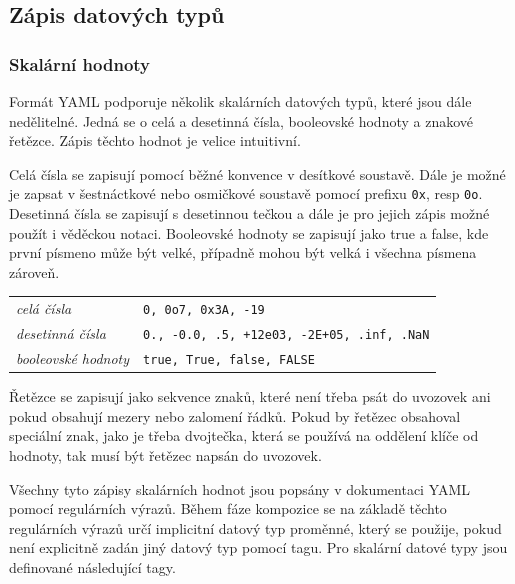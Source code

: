 \documentclass[FM,bw,DP]{tulthesis}
\begin{document}

\subsection{Zápis datových typů}
\label{sec:analyza-yaml-zapis-datovych-typu}

\subsubsection*{Skalární hodnoty}

Formát YAML podporuje několik skalárních datových typů, které jsou dále nedělitelné. Jedná se o celá a desetinná čísla, booleovské hodnoty a znakové řetězce. Zápis těchto hodnot je velice intuitivní. 

Celá čísla se zapisují pomocí běžné konvence v desítkové soustavě. Dále je možné je zapsat v šestnáctkové nebo osmičkové soustavě pomocí prefixu \texttt{0x}, resp \texttt{0o}. Desetinná čísla se zapisují s desetinnou tečkou a dále je pro jejich zápis možné použít i věděckou notaci. Booleovské hodnoty se zapisují jako true a false, kde první písmeno může být velké, případně mohou být velká i všechna písmena zároveň.

\vspace{0.5cm}
\begin{tabular}{m{5cm}@{}l}
\textit{celá čísla}\dotfill & \texttt{0, 0o7, 0x3A, -19} \\
\textit{desetinná čísla}\dotfill & \texttt{0., -0.0, .5, +12e03, -2E+05, .inf, .NaN}  \\
\textit{booleovské hodnoty}\dotfill & \texttt{true, True, false, FALSE}\\
\end{tabular}
\vspace{0.5cm}

Řetězce se zapisují jako sekvence znaků, které není třeba psát do uvozovek ani pokud obsahují mezery nebo zalomení řádků. Pokud by řetězec obsahoval speciální znak, jako je třeba dvojtečka, která se používá na oddělení klíče od hodnoty, tak musí být řetězec napsán do uvozovek.

Všechny tyto zápisy skalárních hodnot jsou popsány v dokumentaci YAML pomocí regulárních výrazů. Během fáze kompozice se na základě těchto regulárních výrazů určí implicitní datový typ proměnné, který se použije, pokud není explicitně zadán jiný datový typ pomocí tagu. Pro skalární datové typy jsou definované následující tagy.
\end{document}
